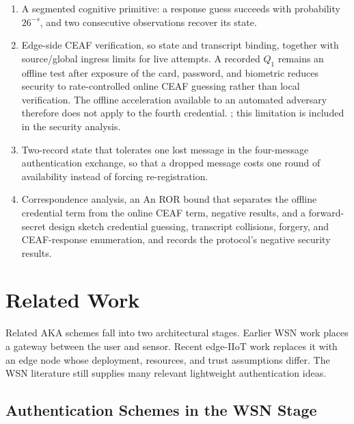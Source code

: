 \documentclass[cmc,article,submit,moreauthors,pdftex]{Definitions/tsp}
\providecommand{\DIFadd}[1]{{\protect\color{blue} \sf #1}} %
\providecommand{\DIFdel}[1]{{\protect\color{red} \scriptsize #1}} %
\providecommand{\DIFaddbegin}{} %
\providecommand{\DIFaddend}{} %
\providecommand{\DIFdelbegin}{} %
\providecommand{\DIFdelend}{} %
\begin{document}
\begin{enumerate}
\item A segmented cognitive primitive: a response guess succeeds with probability $26^{-s}$, and two consecutive observations recover its state.
\item Edge-side CEAF \DIFdelbegin \DIFdel{verification, so }\DIFdelend \DIFaddbegin \DIFadd{state and transcript binding, together with source/global ingress limits for live attempts. A recorded $Q_1$ remains an offline test after }\DIFaddend exposure of the card, password, and biometric\DIFdelbegin \DIFdel{reduces security to rate-controlled online CEAF guessing rather than local verification.
The offline acceleration available to an automated adversary therefore does not apply to the fourth credential.
}\DIFdelend \DIFaddbegin \DIFadd{; this limitation is included in the security analysis.
}\DIFaddend \item Two-record state that tolerates one lost message in the four-message authentication exchange, so that a dropped message costs one round of availability instead of forcing re-registration.
\item \DIFdelbegin \DIFdel{Correspondence analysis, an }\DIFdelend \DIFaddbegin \DIFadd{An }\DIFaddend ROR bound that separates \DIFdelbegin \DIFdel{the offline credential term from the online CEAF term, negative results, and a forward-secret design sketch}\DIFdelend \DIFaddbegin \DIFadd{credential guessing, transcript collisions, forgery, and CEAF-response enumeration, and records the protocol's negative security results}\DIFaddend .
\end{enumerate}

\section{Related Work}

Related AKA schemes fall into two architectural stages. Earlier WSN work places a gateway between the user and sensor. Recent edge-IIoT work replaces it with an edge node whose deployment, resources, and trust assumptions differ. The WSN literature still supplies many relevant lightweight authentication ideas.

\subsection{Authentication Schemes in the WSN Stage}
\end{document}
